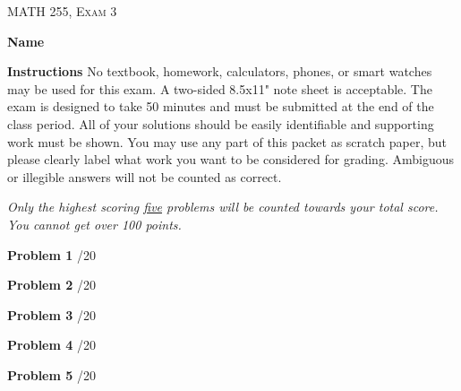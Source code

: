 \documentclass[12pt]{amsbook}
\begin{document}





\begin{center}
   \textsc{\large MATH 255, Exam 3}\\
\end{center}
\vspace{1cm}

\textbf{Name} \; \underline{\hspace{8cm}}

\vspace{1cm}

\textbf{Instructions} \; No textbook, homework, calculators, phones, or smart watches may be used for this exam. A two-sided 8.5x11" note sheet is acceptable.  The exam is designed to take 50 minutes and must be submitted at the end of the class period. All of your solutions should be easily identifiable and supporting work must be shown. You may use any part of this packet as scratch paper, but please clearly label what work you want to be considered for grading. Ambiguous or illegible answers will not be counted as correct.

\emph{Only the highest scoring \underline{five} problems will be counted towards your total score. You cannot get over 100 points.}

\vspace{1cm}

\textbf{Problem 1} \; \underline{\hspace{1cm}}/20

\vspace{.25cm}

\textbf{Problem 2} \; \underline{\hspace{1cm}}/20

\vspace{.25cm}

\textbf{Problem 3} \; \underline{\hspace{1cm}}/20

\vspace{.25cm}

\textbf{Problem 4} \; \underline{\hspace{1cm}}/20

\vspace{.25cm}

\textbf{Problem 5} \; \underline{\hspace{1cm}}/20

\vspace{.25cm}
\end{document}
